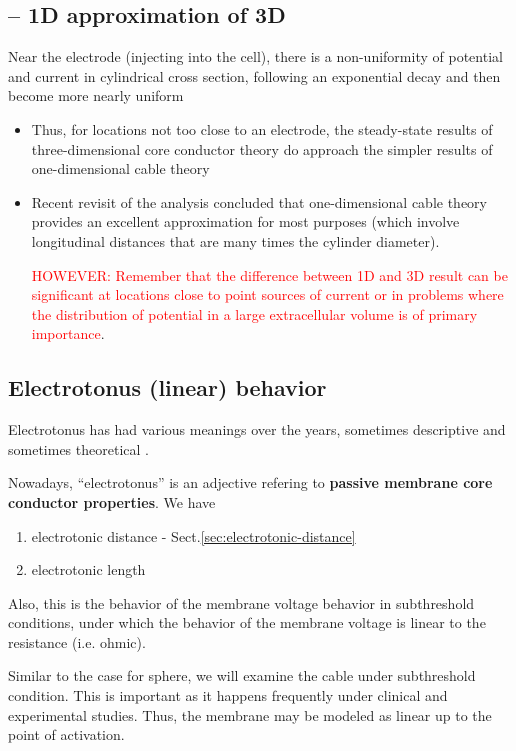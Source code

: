 \subsection{-- 1D approximation of 3D}

Near the electrode (injecting into the cell), there is a non-uniformity of
potential and current in cylindrical cross section, following an exponential
decay and then become more nearly uniform
\begin{itemize}
  \item  Thus, for locations not too close to an electrode, the steady-state
  results of three-dimensional core conductor theory do approach the simpler
results of one-dimensional cable theory

  \item  Recent revisit of the analysis concluded that one-dimensional cable
  theory provides an excellent approximation for most purposes (which involve
  longitudinal distances that are many times the cylinder diameter).
  
\textcolor{red}{HOWEVER: Remember that the difference between 1D and 3D result
can be significant at locations close to point sources of current or in problems where
the distribution of potential in a large extracellular volume is of primary
importance}.

\end{itemize}


\subsection{Electrotonus (linear) behavior}
\label{sec:electrotonus_linearbehavior}

Electrotonus has had various meanings over the years, sometimes descriptive and
sometimes theoretical \citep{rall1977}.

Nowadays, ``electrotonus'' is an adjective refering to 
{\bf passive membrane core conductor properties}. We have
\begin{enumerate}
  \item electrotonic distance - Sect.\ref{sec:electrotonic-distance}
  

  \item electrotonic length
\end{enumerate}
Also, this is the behavior of the membrane voltage behavior in subthreshold
conditions, under which the behavior of the membrane voltage is linear to the
resistance (i.e. ohmic).
 
Similar to the case for sphere, we will examine the cable under
subthreshold condition. This is important as it happens frequently
under clinical and experimental studies. Thus, the membrane may be
modeled as linear up to the point of activation.

